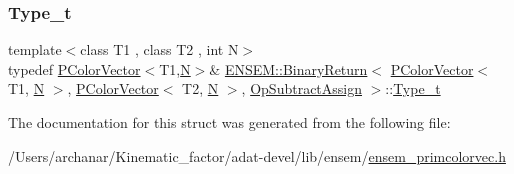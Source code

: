 \subsubsection{\texorpdfstring{Type\_t}{Type\_t}\hspace{0.1cm}{\footnotesize\ttfamily [3/3]}}
{\footnotesize\ttfamily template$<$class T1 , class T2 , int N$>$ \\
typedef \mbox{\hyperlink{classENSEM_1_1PColorVector}{P\+Color\+Vector}}$<$T1,\mbox{\hyperlink{adat__devel_2lib_2hadron_2operator__name__util_8cc_a7722c8ecbb62d99aee7ce68b1752f337}{N}}$>$\& \mbox{\hyperlink{structENSEM_1_1BinaryReturn}{E\+N\+S\+E\+M\+::\+Binary\+Return}}$<$ \mbox{\hyperlink{classENSEM_1_1PColorVector}{P\+Color\+Vector}}$<$ T1, \mbox{\hyperlink{adat__devel_2lib_2hadron_2operator__name__util_8cc_a7722c8ecbb62d99aee7ce68b1752f337}{N}} $>$, \mbox{\hyperlink{classENSEM_1_1PColorVector}{P\+Color\+Vector}}$<$ T2, \mbox{\hyperlink{adat__devel_2lib_2hadron_2operator__name__util_8cc_a7722c8ecbb62d99aee7ce68b1752f337}{N}} $>$, \mbox{\hyperlink{structENSEM_1_1OpSubtractAssign}{Op\+Subtract\+Assign}} $>$\+::\mbox{\hyperlink{structENSEM_1_1BinaryReturn_3_01PColorVector_3_01T1_00_01N_01_4_00_01PColorVector_3_01T2_00_01N_01_4_00_01OpSubtractAssign_01_4_a7d35e6ce8c14bb6e40e75b5f94075018}{Type\+\_\+t}}}



The documentation for this struct was generated from the following file\+:\begin{DoxyCompactItemize}
\item 
/\+Users/archanar/\+Kinematic\+\_\+factor/adat-\/devel/lib/ensem/\mbox{\hyperlink{adat-devel_2lib_2ensem_2ensem__primcolorvec_8h}{ensem\+\_\+primcolorvec.\+h}}\end{DoxyCompactItemize}
